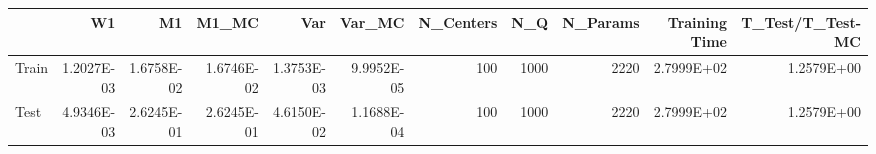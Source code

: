 \begin{tabular}{lrrrrrrrrrr}
\toprule
{} &         W1 &         M1 &      M1\_MC &        Var &     Var\_MC &  N\_Centers &   N\_Q &  N\_Params &  Training Time &  T\_Test/T\_Test-MC \\
\midrule
Train & 1.2027E-03 & 1.6758E-02 & 1.6746E-02 & 1.3753E-03 & 9.9952E-05 &        100 &  1000 &      2220 &     2.7999E+02 &        1.2579E+00 \\
Test  & 4.9346E-03 & 2.6245E-01 & 2.6245E-01 & 4.6150E-02 & 1.1688E-04 &        100 &  1000 &      2220 &     2.7999E+02 &        1.2579E+00 \\
\bottomrule
\end{tabular}
